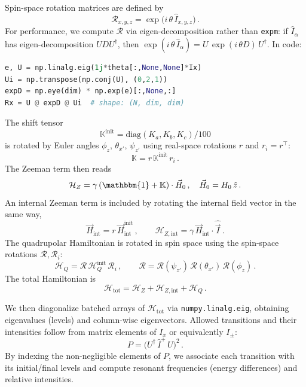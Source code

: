 \documentclass[12pt]{article}
\begin{document}
Spin-space rotation matrices are defined by
\begin{equation}
\mathcal{R}_{x,y,z} = \exp\bigl(i\,\theta\,\hat{I}_{x,y,z}\bigr)\,.
\end{equation}
For performance, we compute \(\mathcal{R}\) via eigen-decomposition rather than \verb|expm|: if \(\hat{I}_{\alpha}\) has eigen-decomposition \(U D U^{\dagger}\), then \(\exp(i\,\theta\,\hat{I}_{\alpha}) = U\,\exp(i\,\theta D)\,U^{\dagger}\). In code:
\begin{lstlisting}[language=Python]
e, U = np.linalg.eig(1j*theta[:,None,None]*Ix)
Ui = np.transpose(np.conj(U), (0,2,1))
expD = np.eye(dim) * np.exp(e)[:,None,:]
Rx = U @ expD @ Ui  # shape: (N, dim, dim)
\end{lstlisting}

The shift tensor
\begin{equation}
\mathbb{K}^{\mathrm{init}} = \mathrm{diag}(K_a, K_b, K_c)/100
\end{equation}
is rotated by Euler angles \(\phi_z,\,\theta_{x'},\,\psi_{z'}\) using real-space rotations \(r\) and \(r_i=r^\top\):
\begin{equation}
\mathbb{K} = r\,\mathbb{K}^{\mathrm{init}}\,r_i\,.
\end{equation}
The Zeeman term then reads
\begin{equation}
\mathcal{H}_Z = \gamma\,(\mathbbm{1}+\mathbb{K})\cdot\vec{H}_0\,,\quad \vec{H}_0=H_0\,\hat{z}\,.
\end{equation}
An internal Zeeman term is included by rotating the internal field vector in the same way,
\begin{equation}
\vec{H}_{\mathrm{int}} = r\,\vec{H}_{\mathrm{int}}^{\mathrm{init}}\,,\qquad
\mathcal{H}_{Z,\mathrm{int}} = \gamma\,\vec{H}_{\mathrm{int}}\cdot\hat{\vec{I}}\,.
\end{equation}
The quadrupolar Hamiltonian is rotated in spin space using the spin-space rotations \(\mathcal{R},\mathcal{R}_i\):
\begin{equation}
\mathcal{H}_Q = \mathcal{R}\,\mathcal{H}_Q^{\mathrm{init}}\,\mathcal{R}_i\,,\qquad
\mathcal{R}=\mathcal{R}(\psi_{z'})\,\mathcal{R}(\theta_{x'})\,\mathcal{R}(\phi_z)\,.
\end{equation}
The total Hamiltonian is
\begin{equation}
\mathcal{H}_{\mathrm{tot}} = \mathcal{H}_Z + \mathcal{H}_{Z,\mathrm{int}} + \mathcal{H}_Q\,.
\end{equation}

We then diagonalize batched arrays of \(\mathcal{H}_{\mathrm{tot}}\) via \verb|numpy.linalg.eig|, obtaining eigenvalues (levels) and column-wise eigenvectors. Allowed transitions and their intensities follow from matrix elements of \(I_x\) or equivalently \(I_\pm\):
\begin{equation}
P = \bigl(U^{\dagger}\,\hat{I}^+\,U\bigr)^2\,.
\end{equation}
By indexing the non-negligible elements of \(P\), we associate each transition with its initial/final levels and compute resonant frequencies (energy differences) and relative intensities.
\end{document}
